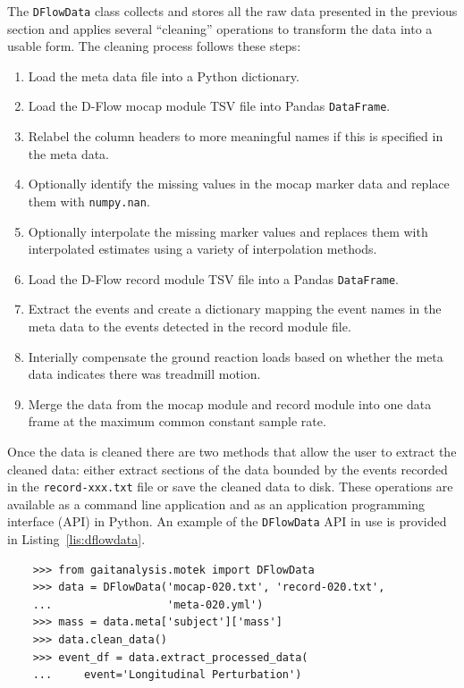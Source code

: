 \documentclass[fleqn,12pt]{wlpeerj}
\begin{document}
The \verb|DFlowData| class collects and stores all the raw data presented in
the previous section and applies several ``cleaning'' operations to transform
the data into a usable form. The cleaning process follows these steps:
%
\begin{enumerate}
  \item Load the meta data file into a Python dictionary.
  \item Load the D-Flow mocap module TSV file into Pandas \verb|DataFrame|.
  \item Relabel the column headers to more meaningful names if this is
    specified in the meta data.
  \item Optionally identify the missing values in the mocap marker data and
    replace them with \verb|numpy.nan|.
  \item Optionally interpolate the missing marker values and replaces them
    with interpolated estimates using a variety of interpolation methods.
  \item Load the D-Flow record module TSV file into a Pandas \verb|DataFrame|.
  \item Extract the events and create a dictionary mapping the event names in
    the meta data to the events detected in the record module file.
  \item Interially compensate the ground reaction loads based on whether the
    meta data indicates there was treadmill motion.
  \item Merge the data from the mocap module and record module into one data
    frame at the maximum common constant sample rate.
\end{enumerate}

Once the data is cleaned there are two methods that allow the user to extract
the cleaned data: either extract sections of the data bounded by the events
recorded in the \verb|record-xxx.txt| file or save the cleaned data to disk.
These operations are available as a command line application and as an
application programming interface (API) in Python. An example of the
\verb|DFlowData| API in use is provided in Listing~\ref{lis:dflowdata}.
%
\begin{listing}
  \begin{verbatim}
    >>> from gaitanalysis.motek import DFlowData
    >>> data = DFlowData('mocap-020.txt', 'record-020.txt',
    ...                  'meta-020.yml')
    >>> mass = data.meta['subject']['mass']
    >>> data.clean_data()
    >>> event_df = data.extract_processed_data(
    ...     event='Longitudinal Perturbation')
  \end{verbatim}
  \cprotect\caption{Python interpreter session showing how one could load a
    trial into memory, extract the subject's mass from the meta data, run the
    data cleaning process, and finally extract a Pandas \verb|DataFrame|
    containing all of the time histories for a specific event in the trial.}
  \label{lis:dflowdata}
\end{listing}
\end{document}
